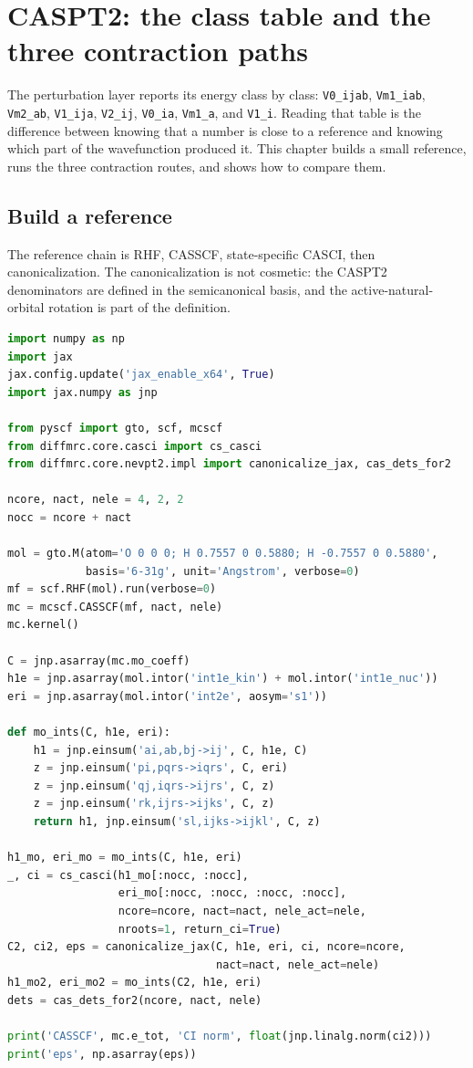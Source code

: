 \section{CASPT2: the class table and the three contraction paths}
\label{sec:caspt2-tutorial}

The perturbation layer reports its energy class by class:
\texttt{V0\_ijab}, \texttt{Vm1\_iab}, \texttt{Vm2\_ab},
\texttt{V1\_ija}, \texttt{V2\_ij}, \texttt{V0\_ia},
\texttt{Vm1\_a}, and \texttt{V1\_i}.  Reading that table is the
difference between knowing that a number is close to a reference and
knowing which part of the wavefunction produced it.  This chapter
builds a small reference, runs the three contraction routes, and shows
how to compare them.

\subsection{Build a reference}

The reference chain is RHF, CASSCF, state-specific CASCI, then
canonicalization.  The canonicalization is not cosmetic: the CASPT2
denominators are defined in the semicanonical basis, and the
active-natural-orbital rotation is part of the definition.

\begin{lstlisting}[language=Python]
import numpy as np
import jax
jax.config.update('jax_enable_x64', True)
import jax.numpy as jnp

from pyscf import gto, scf, mcscf
from diffmrc.core.casci import cs_casci
from diffmrc.core.nevpt2.impl import canonicalize_jax, cas_dets_for2

ncore, nact, nele = 4, 2, 2
nocc = ncore + nact

mol = gto.M(atom='O 0 0 0; H 0.7557 0 0.5880; H -0.7557 0 0.5880',
            basis='6-31g', unit='Angstrom', verbose=0)
mf = scf.RHF(mol).run(verbose=0)
mc = mcscf.CASSCF(mf, nact, nele)
mc.kernel()

C = jnp.asarray(mc.mo_coeff)
h1e = jnp.asarray(mol.intor('int1e_kin') + mol.intor('int1e_nuc'))
eri = jnp.asarray(mol.intor('int2e', aosym='s1'))

def mo_ints(C, h1e, eri):
    h1 = jnp.einsum('ai,ab,bj->ij', C, h1e, C)
    z = jnp.einsum('pi,pqrs->iqrs', C, eri)
    z = jnp.einsum('qj,iqrs->ijrs', C, z)
    z = jnp.einsum('rk,ijrs->ijks', C, z)
    return h1, jnp.einsum('sl,ijks->ijkl', C, z)

h1_mo, eri_mo = mo_ints(C, h1e, eri)
_, ci = cs_casci(h1_mo[:nocc, :nocc],
                 eri_mo[:nocc, :nocc, :nocc, :nocc],
                 ncore=ncore, nact=nact, nele_act=nele,
                 nroots=1, return_ci=True)
C2, ci2, eps = canonicalize_jax(C, h1e, eri, ci, ncore=ncore,
                                nact=nact, nele_act=nele)
h1_mo2, eri_mo2 = mo_ints(C2, h1e, eri)
dets = cas_dets_for2(ncore, nact, nele)

print('CASSCF', mc.e_tot, 'CI norm', float(jnp.linalg.norm(ci2)))
print('eps', np.asarray(eps))
\end{lstlisting}

